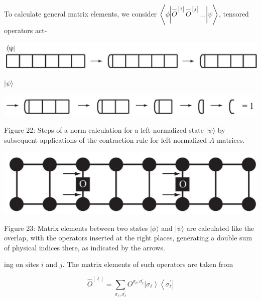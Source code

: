 \documentclass[12pt]{article}
\begin{document}
To calculate general matrix elements, we consider $\left\langle\phi\left|\hat{O}^{[i]} \hat{O}^{[j]} \ldots\right| \psi\right\rangle$, tensored operators act-

\begin{center}
\includegraphics[max width=\textwidth]{2024_05_04_afc4ad226da9ccfe0ac8g-036(1)}
\end{center}

$|\psi\rangle$

\begin{center}
\includegraphics[max width=\textwidth]{2024_05_04_afc4ad226da9ccfe0ac8g-036}
\end{center}

Figure 22: Steps of a norm calculation for a left normalized state $|\psi\rangle$ by subsequent applications of the contraction rule for left-normalized $A$-matrices.

\begin{center}
\includegraphics[max width=\textwidth]{2024_05_04_afc4ad226da9ccfe0ac8g-036(2)}
\end{center}

Figure 23: Matrix elements between two states $|\phi\rangle$ and $|\psi\rangle$ are calculated like the overlap, with the operators inserted at the right places, generating a double sum of physical indices there, as indicated by the arrows.

ing on sites $i$ and $j$. The matrix elements of such operators are taken from


\begin{equation*}
\hat{O}^{[\ell]}=\sum_{\sigma_{\ell}, \sigma_{\ell}^{\prime}} O^{\sigma_{t}, \sigma_{\ell}^{\prime}}\left|\sigma_{\ell}\right\rangle\left\langle\sigma_{\ell}^{\prime}\right| \tag{96}
\end{equation*}
\end{document}
